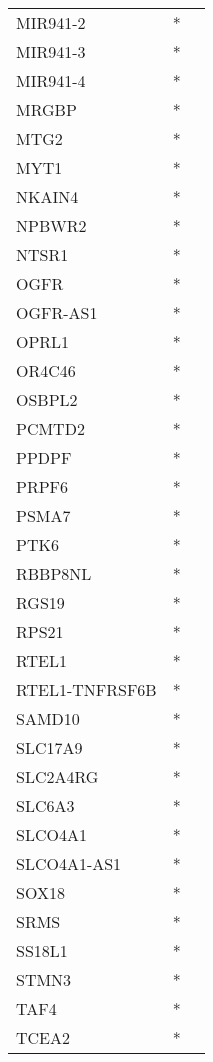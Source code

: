 \begin{longtable}{lcc}
MIR941-2       &  * &         \\
MIR941-3       &  * &         \\
MIR941-4       &  * &         \\
MRGBP          &  * &         \\
MTG2           &  * &         \\
MYT1           &  * &         \\
NKAIN4         &  * &         \\
NPBWR2         &  * &         \\
NTSR1          &  * &         \\
OGFR           &  * &         \\
OGFR-AS1       &  * &         \\
OPRL1          &  * &         \\
OR4C46         &  * &         \\
OSBPL2         &  * &         \\
PCMTD2         &  * &         \\
PPDPF          &  * &         \\
PRPF6          &  * &         \\
PSMA7          &  * &         \\
PTK6           &  * &         \\
RBBP8NL        &  * &         \\
RGS19          &  * &         \\
RPS21          &  * &         \\
RTEL1          &  * &         \\
RTEL1-TNFRSF6B &  * &         \\
SAMD10         &  * &         \\
SLC17A9        &  * &         \\
SLC2A4RG       &  * &         \\
SLC6A3         &  * &         \\
SLCO4A1        &  * &         \\
SLCO4A1-AS1    &  * &         \\
SOX18          &  * &         \\
SRMS           &  * &         \\
SS18L1         &  * &         \\
STMN3          &  * &         \\
TAF4           &  * &         \\
TCEA2          &  * &         \\

\end{longtable}
